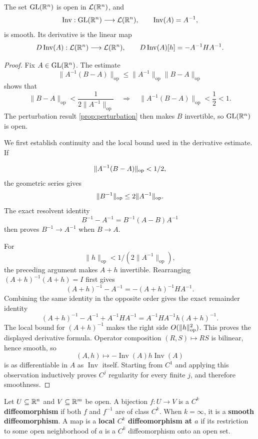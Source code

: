 \begin{lemma}\label{lem:smooth-matrix-inversion}
The set $\operatorname{GL}(\mathbb{R}^n)$ is open in $\mathcal L(\mathbb{R}^n)$, and
\[
\operatorname{Inv}:\operatorname{GL}(\mathbb{R}^n)\longrightarrow
\mathcal L(\mathbb{R}^n),\qquad \operatorname{Inv}(A)=A^{-1},
\]
is smooth. Its derivative is the linear map
\[
D\operatorname{Inv}(A):\mathcal L(\mathbb{R}^n)\longrightarrow
\mathcal L(\mathbb{R}^n),\qquad
D\operatorname{Inv}(A)[h]=-A^{-1}HA^{-1}.
\]
\end{lemma}
\begin{proof}
Fix $A\in\operatorname{GL}(\mathbb{R}^n)$. The estimate
\[
\|A^{-1}(B-A)\|_{\mathrm{op}}
\leq\|A^{-1}\|_{\mathrm{op}}\|B-A\|_{\mathrm{op}}
\]
shows that
\[
\|B-A\|_{\mathrm{op}}<\frac{1}{2\|A^{-1}\|_{\mathrm{op}}}
\quad\Longrightarrow\quad
\|A^{-1}(B-A)\|_{\mathrm{op}}<\frac12<1.
\]
The perturbation result \cref{prop:perturbation} then makes $B$ invertible,
so $\operatorname{GL}(\mathbb{R}^n)$ is open.

We first establish continuity and the local bound used in the derivative
estimate. If

\[
\lVert A^{-1}(B-A)\rVert_{\mathrm{op}}<1/2,
\]
 the geometric series gives
\[
\lVert B^{-1}\rVert_{\mathrm{op}}\leq2\lVert A^{-1}\rVert_{\mathrm{op}}.
\]
The exact resolvent identity
\[
B^{-1}-A^{-1}=B^{-1}(A-B)A^{-1}
\]
then proves $B^{-1}\to A^{-1}$ when $B\to A$.

For
\[
\|h\|_{\mathrm{op}}<1/(2\|A^{-1}\|_{\mathrm{op}}),
\]
 the preceding
argument makes $A+h$ invertible. Rearranging
$(A+h)^{-1}(A+h)=I$ first gives
\[
(A+h)^{-1}-A^{-1}=-(A+h)^{-1}HA^{-1}.
\]
Combining the same identity in the opposite order gives the exact remainder
identity
\[
(A+h)^{-1}-A^{-1}+A^{-1}HA^{-1}
=A^{-1}HA^{-1}h(A+h)^{-1}.
\]
The local bound for $(A+h)^{-1}$ makes the right side
$O(\lVert h\rVert_{\mathrm{op}}^2)$. This proves the displayed derivative formula.
Operator composition
$(R,S)\mapsto RS$ is bilinear, hence smooth, so
\[
(A,h)\longmapsto-\operatorname{Inv}(A)h\operatorname{Inv}(A)
\]
is as differentiable in $A$ as $\operatorname{Inv}$ itself. Starting from
$C^1$ and applying this observation inductively proves $C^j$ regularity for
every finite $j$, and therefore smoothness.
\end{proof}

\begin{definition}[Diffeomorphisms]
\label{def:diffeomorphism}
Let $U\subseteq\mathbb{R}^n$ and $V\subseteq\mathbb{R}^m$ be open. A bijection
$f:U\to V$ is a \textbf{$C^k$ diffeomorphism} if both $f$ and $f^{-1}$
are of class $C^k$. When $k=\infty$, it is a \textbf{smooth
diffeomorphism}. A map is a \textbf{local $C^k$ diffeomorphism at $a$}
if its restriction to some open neighborhood of $a$ is a $C^k$
diffeomorphism onto an open set.
\end{definition}

